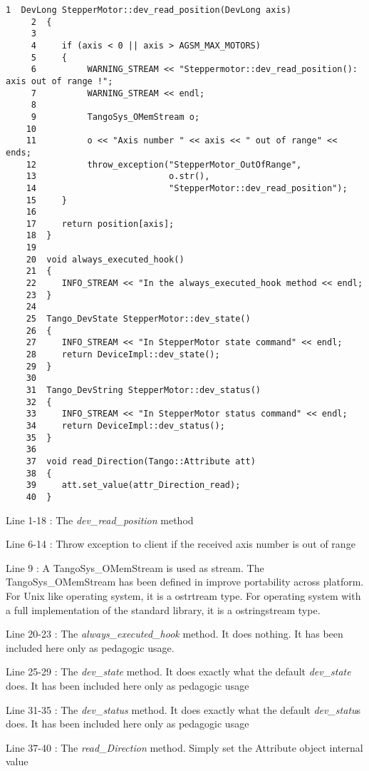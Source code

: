 \begin{verbatim}
1  DevLong StepperMotor::dev_read_position(DevLong axis)
     2  {
     3  
     4     if (axis < 0 || axis > AGSM_MAX_MOTORS)
     5     {
     6          WARNING_STREAM << "Steppermotor::dev_read_position(): axis out of range !";
     7          WARNING_STREAM << endl;
     8                  
     9          TangoSys_OMemStream o;
    10                  
    11          o << "Axis number " << axis << " out of range" << ends;
    12          throw_exception("StepperMotor_OutOfRange",
    13                          o.str(),
    14                          "StepperMotor::dev_read_position");
    15     }
    16  
    17     return position[axis];
    18  }
    19  
    20  void always_executed_hook()
    21  {
    22     INFO_STREAM << "In the always_executed_hook method << endl;
    23  }
    24  
    25  Tango_DevState StepperMotor::dev_state()
    26  {
    27     INFO_STREAM << "In StepperMotor state command" << endl;
    28     return DeviceImpl::dev_state();
    29  }
    30  
    31  Tango_DevString StepperMotor::dev_status()
    32  {
    33     INFO_STREAM << "In StepperMotor status command" << endl;
    34     return DeviceImpl::dev_status();
    35  }
    36  
    37  void read_Direction(Tango::Attribute att)
    38  {
    39     att.set_value(attr_Direction_read);
    40  }
\end{verbatim}


Line 1-18 : The \emph{dev\_read\_position} method

Line 6-14 : Throw exception to client if the received axis number
is out of range

Line 9 : A TangoSys\_OMemStream is used as stream. The TangoSys\_OMemStream
has been defined in improve portability across platform. For Unix
like operating system, it is a ostrtream type. For operating system
with a full implementation of the standard library, it is a ostringstream
type.

Line 20-23 : The \emph{always\_executed\_hook} method. It does nothing.
It has been included here only as pedagogic usage.

Line 25-29 : The \emph{dev\_state} method. It does exactly what the
default \emph{dev\_state} does. It has been included here only as
pedagogic usage

Line 31-35 : The \emph{dev\_status} method. It does exactly what the
default \emph{dev\_statu}s does. It has been included here only as
pedagogic usage

Line 37-40 : The \emph{read\_Direction} method. Simply set the Attribute
object internal value


